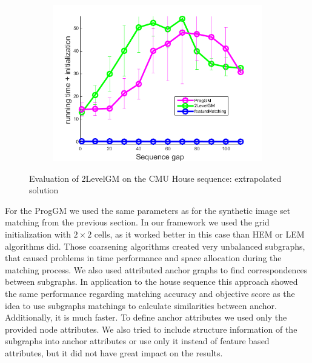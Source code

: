 \begin{figure}[h]
\begin{subfigure}[b]{0.32\textwidth}
			\includegraphics[scale=0.25]{"chapter3/fig/HouseSeq2/anchor_descr/using_cpd_afftrafo/ext_solution/performance/time_summary"}
		\end{subfigure} 	
	\caption[Evaluation of 2LevelGM on the CMU House sequence]{Evaluation of 2LevelGM on the CMU House sequence: extrapolated solution} \label{fig:House_ext_sol}
\end{figure}

For the ProgGM we used the same parameters as for the synthetic image set matching from the previous section.
In our framework we used the grid initialization with $2\times 2$ cells, as it worked better in this case than HEM or LEM algorithms did. Those coarsening algorithms created very unbalanced subgraphs, that caused problems in time performance and space allocation during the matching process. We also used attributed anchor graphs to find correspondences between subgraphs. In application to the house sequence this approach showed the same performance regarding matching accuracy and objective score as the idea to use subgraphs matchings to calculate similarities between anchor. Additionally, it is much faster. To define anchor attributes we used only the provided node attributes. We also tried to include structure information of the subgraphs into anchor attributes or use only it instead of feature based attributes, but it did not have great impact on the results.

